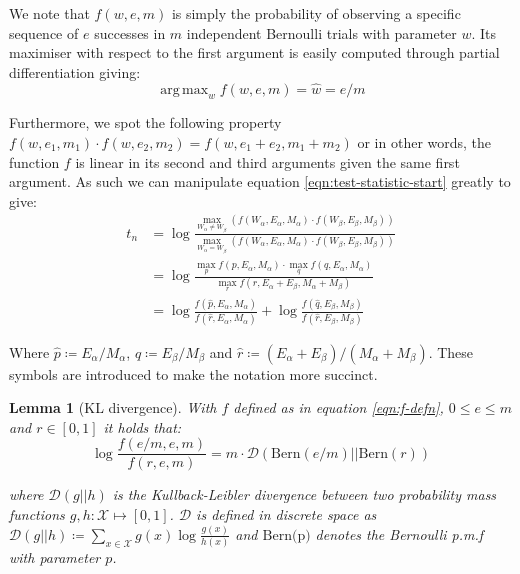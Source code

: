 \documentclass[]{article}
\DeclareMathOperator*{\argmax}{arg\,max}
\newcommand{\Xcal}{\mathcal{X}}
\newcommand{\kl}{\mathcal{D}}
\newtheorem{lemma}[theorem]{Lemma}
\begin{document}
We note that $f(w, e, m)$ is simply the probability of observing a specific sequence of $e$ successes in $m$ independent Bernoulli trials with parameter $w$. Its maximiser with respect to the first argument is easily computed through partial differentiation giving:
%
\begin{equation}
	\argmax_w f(w, e, m) = \hat{w} = e / m
	\label{eqn:f-maximiser}
\end{equation}

Furthermore, we spot the following property $f(w, e_1, m_1) \cdot f(w, e_2, m_2) = f(w, e_1 + e_2, m_1 + m_2)$ or in other words, the function $f$ is linear in its second and third arguments given the same first argument. As such we can manipulate equation \ref{eqn:test-statistic-start} greatly to give:
%
\begin{align}
	t_n &= \log \frac
	{
		\max_{W_{\alpha} \neq W_{\beta}}(f (W_\alpha, E_\alpha, M_\alpha) \cdot f (W_\beta, E_\beta, M_\beta))
	}
	{
		\max_{W_\alpha = W_\beta} (f (W_\alpha, E_\alpha, M_\alpha) \cdot f (W_\beta, E_\beta, M_\beta))
	} \nonumber \\
	&= \log \frac{
		\max_p f(p, E_\alpha, M_\alpha) \cdot \max_q f(q, E_\alpha, M_\alpha)
	}{
		\max_r f(r, E_\alpha + E_\beta, M_\alpha + M_\beta)
	} \nonumber \\
	&= \log \frac{f(\hat{p}, E_\alpha, M_\alpha)}{f(\hat{r}, E_\alpha, M_\alpha)} + \log \frac{f(\hat{q}, E_\beta, M_\beta)}{f(\hat{r}, E_\beta, M_\beta)}
\end{align}

Where $\hat{p} \coloneqq E_\alpha / M_\alpha$, $\hat{q} \coloneqq E_\beta / M_\beta$ and $\hat{r} \coloneqq (E_\alpha + E_\beta) / (M_\alpha + M_\beta)$. These symbols are introduced to make the notation more succinct.

\begin{lemma}[KL divergence]
	With $f$ defined as in equation \ref{eqn:f-defn}, $0 \leq e \leq m$ and $r \in [0, 1]$ it holds that:
	\begin{equation*}
		\log \frac{f(e/m, e, m)}{f(r, e, m)} = m \cdot \kl \left( \textrm{Bern}(e/m) || \textrm{Bern}(r) \right)
	\end{equation*}

	where $\kl(g || h)$ is the Kullback-Leibler divergence between two probability mass functions $g, h: \Xcal \mapsto [0, 1]$. $\kl$ is defined in discrete space as $\kl(g || h) \coloneqq \sum_{x \in \Xcal} g(x) \log \frac{g(x)}{h(x)}$ and $\textrm{Bern(p)}$ denotes the Bernoulli p.m.f with parameter $p$.
	\label{lem:kl-div}
\end{lemma}
\end{document}
